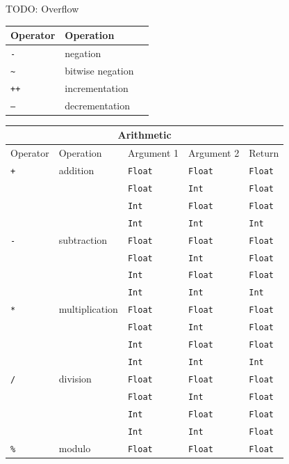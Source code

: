 \documentclass{article}
\newcommand{\type}[1]{\texttt{#1}}
\newcommand{\expr}[1]{\texttt{#1}}
\newcommand{\todo}[1]{TODO: #1}
\begin{document}
\todo{Overflow}

\begin{center}
\begin{tabular}{| l | l | l |}
	\hline
	Operator & Operation \\ \hline
	\expr{-} & negation \\
	\expr{\textasciitilde} & bitwise negation \\
	\expr{++} & incrementation \\
	\expr{--} & decrementation \\ \hline
\end{tabular}
\end{center}

\begin{center}
\begin{tabular}{| l | l | l | l | l |}
	\hline
	\multicolumn{5}{|c|}{Arithmetic} \\ \hline
	Operator & Operation & Argument 1 & Argument 2 & Return \\ \hline
	\expr{+} & addition & \type{Float} & \type{Float} & \type{Float} \\
	& & \type{Float} & \type{Int} & \type{Float} \\
	& & \type{Int} & \type{Float} & \type{Float} \\
	& & \type{Int} & \type{Int} & \type{Int} \\
	\expr{-} & subtraction & \type{Float} & \type{Float} & \type{Float} \\
	& & \type{Float} & \type{Int} & \type{Float} \\
	& & \type{Int} & \type{Float} & \type{Float} \\
	& & \type{Int} & \type{Int} & \type{Int} \\
	\expr{*} & multiplication & \type{Float} & \type{Float} & \type{Float} \\
	& & \type{Float} & \type{Int} & \type{Float} \\
	& & \type{Int} & \type{Float} & \type{Float} \\
	& & \type{Int} & \type{Int} & \type{Int} \\	
	\expr{/} & division & \type{Float} & \type{Float} & \type{Float} \\
	& & \type{Float} & \type{Int} & \type{Float} \\
	& & \type{Int} & \type{Float} & \type{Float} \\
	& & \type{Int} & \type{Int} & \type{Float} \\
	\expr{\%} & modulo & \type{Float} & \type{Float} & \type{Float} \\

\end{tabular}
\end{center}
\end{document}
